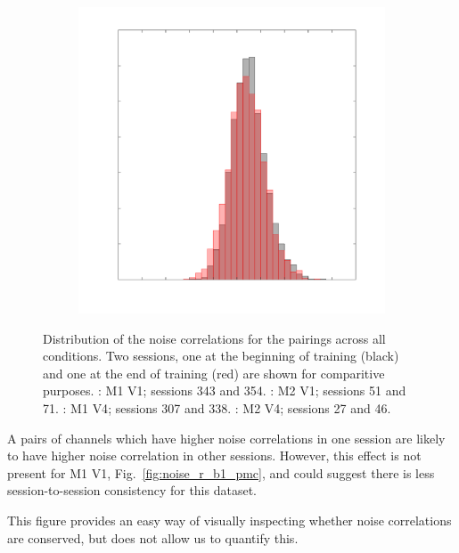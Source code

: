 \begin{figure}[htbp]
\begin{subfigure}[b]{0.5\linewidth}
        \includegraphics[width=\linewidth]{figs/decoding/rcoef_sess_histallover_v4_jack.pdf}
    \end{subfigure}
    \caption{Distribution of the noise correlations for the pairings across all conditions.
Two sessions, one at the beginning of training (black) and one at the end of training (red) are shown for comparitive purposes.
\protect{}: \ac{M1} \ac{V1}; sessions 343 and 354.
\protect{}: \ac{M2} \ac{V1}; sessions 51 and 71.
\protect{}: \ac{M1} \ac{V4}; sessions 307 and 338.
\protect{}: \ac{M2} \ac{V4}; sessions 27 and 46.
}
    \label{fig:noise_r_hist}
\end{figure}


A pairs of channels which have higher noise correlations in one session are likely to have higher noise correlation in other sessions.
However, this effect is not present for \ac{M1} \ac{V1}, Fig.~\ref{fig:noise_r_b1_pmc}, and could suggest there is less session-to-session consistency for this dataset.

This figure provides an easy way of visually inspecting whether noise correlations are conserved, but does not allow us to quantify this.

